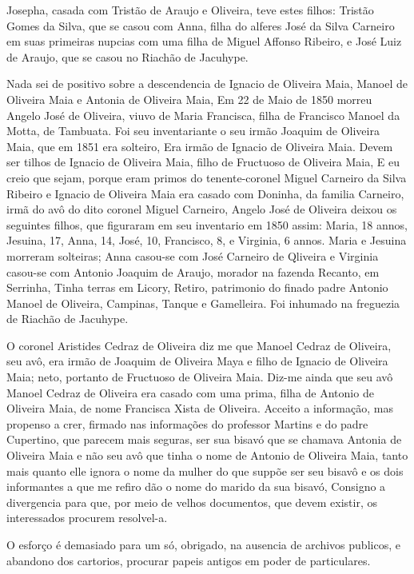 Josepha, casada com Tristão de Araujo e Oliveira, teve estes filhos: Tristão Gomes da Silva, que se casou com Anna, filha do alferes José da Silva Carneiro em suas primeiras nupcias com uma filha de Miguel Affonso Ribeiro, e José Luiz de Araujo, que se casou no Riachão de Jacuhype.

Nada sei de positivo sobre a descendencia de Ignacio de Oliveira Maia, Manoel de Oliveira Maia e Antonia de Oliveira Maia, Em 22 de Maio de 1850 morreu Angelo José de Oliveira, viuvo de Maria Francisca, filha de Francisco Manoel da Motta, de Tambuata. Foi seu inventariante o seu irmão Joaquim de Oliveira Maia, que em 1851 era solteiro, Era irmão de Ignacio de Oliveira Maia. Devem ser tilhos de Ignacio de Oliveira Maia, filho de Fructuoso de Oliveira Maia, E eu creio que sejam, porque eram primos do tenente-coronel Miguel Carneiro da Silva Ribeiro e Ignacio de Oliveira Maia era casado com Doninha, da familia Carneiro, irmã 
do avô do dito coronel Miguel Carneiro, Angelo José de Oliveira deixou os seguintes filhos, que figuraram em seu inventario em 1850 assim: Maria, 18 annos, Jesuina, 17, Anna, 14, José, 10, Francisco, 8, e Virginia, 6 annos. Maria e Jesuina morreram solteiras; Anna casou-se com José Carneiro de Qliveira e Virginia casou-se com Antonio Joaquim de Araujo, morador na fazenda Recanto, em Serrinha, Tinha terras em Licory, Retiro, patrimonio do finado padre Antonio Manoel de Oliveira, Campinas, Tanque e
Gamelleira. Foi inhumado na freguezia de Riachão de Jacuhype.

O coronel Aristides Cedraz de Oliveira diz me que Manoel Cedraz de Oliveira, seu avô, era irmão de Joaquim de Oliveira Maya e filho de Ignacio de Oliveira Maia; neto, portanto de Fructuoso de Oliveira Maia. Diz-me ainda que seu avô Manoel Cedraz de Oliveira era casado com uma prima, filha de Antonio de Oliveira Maia, de nome Francisca Xista de Oliveira. Acceito a informação, mas propenso a crer, firmado nas informações do professor Martins e do padre Cupertino, que parecem mais seguras, ser sua bisavó que se chamava Antonia de Oliveira Maia e não seu avô que tinha o nome de Antonio de Oliveira Maia, tanto mais quanto elle ignora o nome da mulher do que suppõe ser seu bisavô e os dois informantes a que me refiro dão o nome do marido da sua bisavó, Consigno a divergencia para que, por meio de velhos documentos, que devem existir, os interessados procurem resolvel-a.

O esforço é demasiado para um só, obrigado, na ausencia de archivos publicos, e abandono dos cartorios, procurar papeis antigos em poder de particulares.

